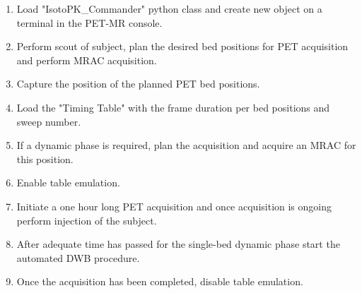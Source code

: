 \begin{enumerate}
    \item Load "IsotoPK\_Commander" python class and create new object on a terminal in the PET-MR console. 
    \item Perform scout of subject, plan the desired bed positions for PET acquisition and perform MRAC acquisition. 
    \item Capture the position of the planned PET bed positions.
    \item Load the "Timing Table" with the frame duration per bed positions and sweep number.
    \item If a dynamic phase is required, plan the acquisition and acquire an MRAC for this position. 
    \item Enable table emulation. 
    \item Initiate a one hour long PET acquisition and once acquisition is ongoing perform injection of the subject. 
    \item After adequate time has passed for the single-bed dynamic phase start the automated DWB procedure. 
    \item Once the acquisition has been completed, disable table emulation. 
\end{enumerate}

